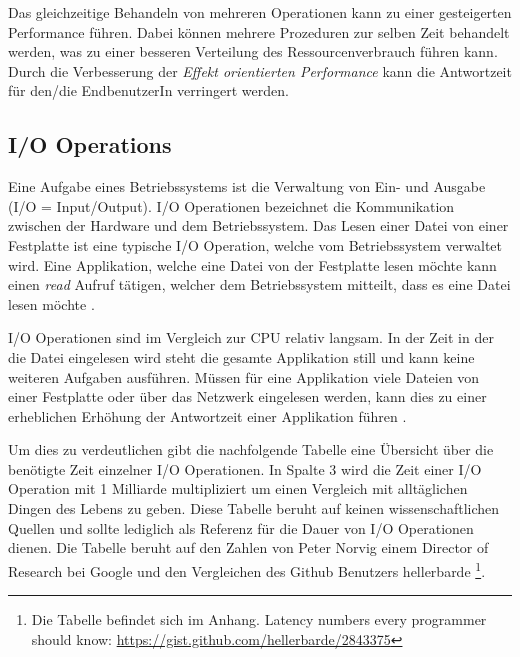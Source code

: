 Das gleichzeitige Behandeln von mehreren Operationen kann zu einer gesteigerten Performance führen. Dabei können mehrere Prozeduren zur selben Zeit behandelt werden, was zu einer besseren Verteilung des Ressourcenverbrauch führen kann. Durch die Verbesserung der \emph{Effekt orientierten Performance} kann die Antwortzeit für den/die EndbenutzerIn verringert werden.

\subsection{I/O Operations}
\label{subsection: io_operationen}

Eine Aufgabe eines Betriebssystems ist die Verwaltung von Ein- und Ausgabe (I/O = Input/Output). I/O Operationen bezeichnet die Kommunikation zwischen der Hardware und dem Betriebssystem. Das Lesen einer Datei von einer Festplatte ist eine typische I/O Operation, welche vom Betriebssystem verwaltet wird. Eine Applikation, welche eine Datei von der Festplatte lesen möchte kann einen \emph{read} Aufruf tätigen, welcher dem Betriebssystem mitteilt, dass es eine Datei lesen möchte \cite[p. 292]{tan09}.

I/O Operationen sind im Vergleich zur CPU relativ langsam. In der Zeit in der die Datei eingelesen wird steht die gesamte Applikation still und kann keine weiteren Aufgaben ausführen. Müssen für eine Applikation viele Dateien von einer Festplatte oder über das Netzwerk eingelesen werden, kann dies zu einer erheblichen Erhöhung der Antwortzeit einer Applikation führen \cite[p. 307]{tan09}. 

Um dies zu verdeutlichen gibt die nachfolgende Tabelle eine Übersicht über die benötigte Zeit einzelner I/O Operationen. In Spalte 3 wird die Zeit einer I/O Operation mit 1 Milliarde multipliziert um einen Vergleich mit alltäglichen Dingen des Lebens zu geben. Diese Tabelle beruht auf keinen wissenschaftlichen Quellen und sollte lediglich als Referenz für die Dauer von I/O Operationen dienen. Die Tabelle beruht auf den Zahlen von Peter Norvig \cite[]{Nor98} einem Director of Research bei Google und den Vergleichen des Github Benutzers hellerbarde \footnote{Die Tabelle befindet sich im Anhang. Latency numbers every programmer should know: \url{https://gist.github.com/hellerbarde/2843375}}.
